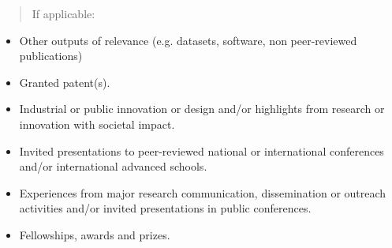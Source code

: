 \documentclass[cv,partner]{nfr}
\begin{document}
\begin{quote}
If applicable:
\end{quote}

\begin{itemize}
\item
  Other outputs of relevance (e.g. datasets, software, non peer-reviewed
  publications)
\item
  Granted patent(s).
\item
  Industrial or public innovation or design and/or highlights from
  research or innovation with societal impact.
\item
  Invited presentations to peer-reviewed national or international
  conferences and/or international advanced schools.
\item
  Experiences from major research communication, dissemination or
  outreach activities and/or invited presentations in public
  conferences.
\item
  Fellowships, awards and prizes.
\end{itemize}
\end{document}
